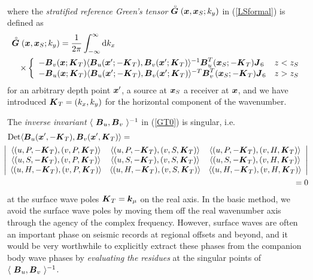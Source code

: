 where the {\em stratified reference Green's tensor\/} $\stackrel{\scriptscriptstyle _{\,\,\circ}}{ \mbox{\boldmath$\mit G$\unboldmath}} 
({\mbox{\boldmath$\mit x$\unboldmath}},{\mbox{\boldmath$\mit x$\unboldmath}}_{S};k_y)$ in (\ref{LSformal}) is defined as
\begin{eqnarray}\label{GT0}
\lefteqn{\rf{\bmi G}({\bmi x},{\bmi x}_{S};k_y)= 
\frac{1}{2 \pi}\int_{-\infty}^{\infty} {\rm d}k_x}\\
&&
\times\left\{
{\begin{array}{ll}
\textstyle
-{\bmi B}_{ v}({\bmi x};{\bmi K}_{T}) \langle{  
{\bmi B}_{u}({\bmi x}^{\prime};-{\bmi K}_{T}),  
{\bmi B}_{v}({\bmi x}^{\prime};{\bmi K}_{T})
}\rangle^{-1}
{\bmi B}^{T}_{u}({\bmi x}_{S};-{\bmi K}_{T}) {\bmi  J}_{6}& 
z<z_{S} \\
\textstyle
-{\bmi B}_{ u} ({\bmi x};{\bmi K}_{T}) \langle{  
{\bmi B}_{u}({\bmi x}^{\prime};-{\bmi K}_{T}),  
{\bmi B}_{v}({\bmi x}^{\prime};{\bmi K}_{T})
}\rangle^{-T}
{\bmi B}^{T}_{v}({\bmi x}_{S};-{\bmi K}_{T}) {\bmi  J}_{6}& z>z_{S} 
\end{array} }\right.\nonumber
\end{eqnarray} 
for an arbitrary depth point ${\mbox{\boldmath$\mit x$\unboldmath}}^{\prime}$, a source at
${\mbox{\boldmath$\mit x$\unboldmath}}_S$ a receiver at ${\mbox{\boldmath$\mit x$\unboldmath}}$, and we have introduced  
${\mbox{\boldmath$\mit K$\unboldmath}}_{T}=(k_x , k_y)$ for the horizontal component of the wavenumber.


The {\em inverse invariant\/} 
$\langle{ \ {\bmi B}_{u},  {\bmi B}_{v}\ }\rangle^{-1}$  
in  (\ref{GT0}) is singular, i.e.
\begin{eqnarray} \label{polecondition}
\lefteqn{\mbox{Det}\langle {\bmi  B}_{u}({\bmi x}^{\prime},-{\bmi K}_{T}),
{\bmi B}_{v}({\bmi x}^{\prime},{\bmi K}_{T}) \rangle
=}\nonumber\\
&&\!\!\!\!\!\!\!\!\!
\left|{\begin{array}{ccc}
\left\langle{(u,P,-{\bmi K}_{T}),(v,P,{\bmi K}_{T})}\right\rangle&
\left\langle{(u,P,-{\bmi K}_{T}),(v,S,{\bmi K}_{T})}\right\rangle&
\left\langle{(u,P,-{\bmi K}_{T}),(v,H,{\bmi K}_{T})}\right\rangle\\ 
\left\langle{(u,S,-{\bmi K}_{T}),(v,P,{\bmi K}_{T})}\right\rangle&
\left\langle{(u,S,-{\bmi K}_{T}),(v,S,{\bmi K}_{T})}\right\rangle&
\left\langle{(u,S,-{\bmi K}_{T}),(v,H,{\bmi K}_{T})}\right\rangle\\
\left\langle{(u,H,-{\bmi K}_{T}),(v,P,{\bmi K}_{T})}\right\rangle&
\left\langle{(u,H,-{\bmi K}_{T}),(v,S,{\bmi K}_{T})}\right\rangle&
\left\langle{(u,H,-{\bmi K}_{T}),(v,H,{\bmi K}_{T})}\right\rangle
\end{array}}\right|\nonumber\\
&&\!\!\!\!\!\!
=0
\end{eqnarray}
at  the surface wave poles ${\mbox{\boldmath$\mit K$\unboldmath}}_{T}={\mbox{\boldmath$\mit k$\unboldmath}}_{\mu}$ on the real axis. In the basic method, we avoid 
 the surface wave poles by moving them off the real wavenumber axis 
 through the agency of the complex frequency. 
However,  surface waves are often an important phase on seismic 
 records at regional offsets and beyond, and it would be very worthwhile 
 to explicitly extract these phases from the companion body wave phases 
 by {\em evaluating the residues\/} at the singular points of 
 $\langle{ \ {\bmi B}_{u},  {\bmi B}_{v}\ }\rangle^{-1}$.  


